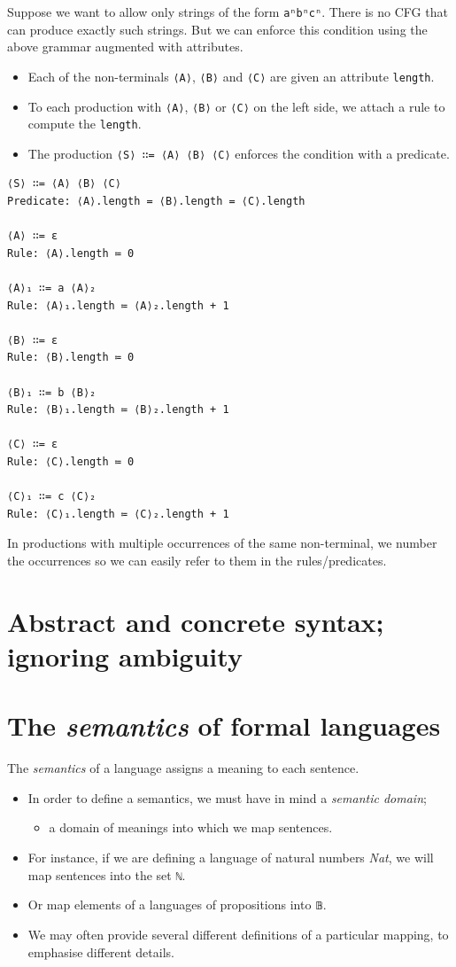 \documentclass[11pt]{article}
\theoremstyle{definition}
\begin{document}
Suppose we want to allow only strings of the form \texttt{aⁿbⁿcⁿ}.
There is no CFG that can produce exactly such strings.
But we can enforce this condition using the above grammar
augmented with attributes.
\begin{itemize}
\item Each of the non-terminals \texttt{⟨A⟩}, \texttt{⟨B⟩} and \texttt{⟨C⟩} are given an attribute
\texttt{length}.
\item To each production with \texttt{⟨A⟩}, \texttt{⟨B⟩} or \texttt{⟨C⟩} on the left side, we attach
a rule to compute the \texttt{length}.
\item The production \texttt{⟨S⟩ ∷= ⟨A⟩ ⟨B⟩ ⟨C⟩} enforces the condition with a predicate.
\end{itemize}

\begin{verbatim}
⟨S⟩ ∷= ⟨A⟩ ⟨B⟩ ⟨C⟩
Predicate: ⟨A⟩.length = ⟨B⟩.length = ⟨C⟩.length

⟨A⟩ ∷= ε
Rule: ⟨A⟩.length ≔ 0

⟨A⟩₁ ∷= a ⟨A⟩₂
Rule: ⟨A⟩₁.length ≔ ⟨A⟩₂.length + 1

⟨B⟩ ∷= ε
Rule: ⟨B⟩.length ≔ 0

⟨B⟩₁ ∷= b ⟨B⟩₂
Rule: ⟨B⟩₁.length ≔ ⟨B⟩₂.length + 1

⟨C⟩ ∷= ε
Rule: ⟨C⟩.length ≔ 0

⟨C⟩₁ ∷= c ⟨C⟩₂
Rule: ⟨C⟩₁.length ≔ ⟨C⟩₂.length + 1
\end{verbatim}

In productions with multiple occurrences of the same non-terminal,
we number the occurrences so we can easily refer to them
in the rules/predicates.

\section{Abstract and concrete syntax; ignoring ambiguity}
\label{sec:org8fe9365}
\section{The \emph{semantics} of formal languages}
\label{sec:orge2efb35}

The \emph{semantics} of a language assigns a meaning to each sentence.
\begin{itemize}
\item In order to define a semantics, we must
have in mind a \emph{semantic domain};
\begin{itemize}
\item a domain of meanings into which we map sentences.
\end{itemize}
\item For instance, if we are defining a language
of natural numbers \emph{Nat}, we will map sentences into the set \texttt{ℕ}.
\item Or map elements of a languages of propositions into \texttt{𝔹}.
\item We may often provide several different definitions of
a particular mapping, to emphasise different details.
\end{itemize}
\end{document}
